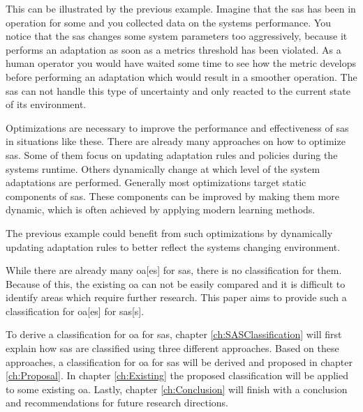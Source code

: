\noindent This can be illustrated by the previous example.
Imagine that the \acrshort{sas} has been in operation for some and you collected data on the systems performance.
You notice that the \acrshort{sas} changes some system parameters too aggressively,
because it performs an adaptation as soon as a metrics threshold has been violated.
As a human operator you would have waited some time to see how the metric develops before performing an adaptation
which would result in a smoother operation.
The \acrshort{sas} can not handle this type of uncertainty and only reacted to the current state of its environment.

\noindent Optimizations are necessary to improve the performance and effectiveness of \acrshort{sas} in situations like these.
There are already many approaches on how to optimize \acrshort{sas}.
Some of them focus on updating adaptation rules and policies during the systems runtime.
Others dynamically change at which level of the system adaptations are performed.
Generally most optimizations target static components of \acrshort{sas}.
These components can be improved by making them more dynamic, 
which is often achieved by applying modern learning methods.

\noindent The previous example could benefit from such optimizations by dynamically updating adaptation rules
to better reflect the systems changing environment.

\noindent While there are already many \acrfull{oa}[es] for \acrshort{sas},
there is no classification for them.
Because of this, the existing \acrshort{oa} can not be easily compared
and it is difficult to identify areas which require further research.
This paper aims to provide such a classification for \acrlong{oa}[es] for \acrlong{sas}[s].

\noindent To derive a classification for \acrshort{oa} for \acrshort{sas},
chapter \ref{ch:SASClassification} will first explain how \acrshort{sas} are classified
using three different approaches.
Based on these approaches, a classification for \acrshort{oa} for \acrshort{sas} will be derived
and proposed in chapter \ref{ch:Proposal}.
In chapter \ref{ch:Existing} the proposed classification will be applied to some existing \acrshort{oa}.
Lastly, chapter \ref{ch:Conclusion} will finish with a conclusion and recommendations for future research directions.
